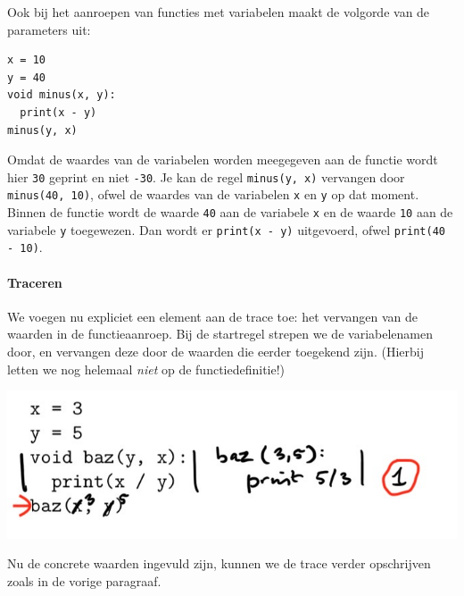 Ook bij het aanroepen van functies met variabelen maakt de volgorde van de parameters uit:

\vspace*{-\baselineskip}\begin{verbatim}
x = 10
y = 40
void minus(x, y):
  print(x - y)
minus(y, x)
\end{verbatim}\vspace*{-\baselineskip}

Omdat de waardes van de variabelen worden meegegeven aan de functie wordt hier \texttt{30} geprint en niet \texttt{-30}. Je kan de regel \texttt{minus(y, x)} vervangen door \texttt{minus(40, 10)}, ofwel de waardes van de variabelen \texttt{x} en \texttt{y} op dat moment. Binnen de functie wordt de waarde \texttt{40} aan de variabele \texttt{x} en de waarde \texttt{10} aan de variabele \texttt{y} toegewezen. Dan wordt er \texttt{print(x - y)} uitgevoerd, ofwel \texttt{print(40 - 10)}.

\paragraph{Traceren}

We voegen nu expliciet een element aan de trace toe: het vervangen van de waarden in de functieaanroep. Bij de startregel strepen we de variabelenamen door, en vervangen deze door de waarden die eerder toegekend zijn. (Hierbij letten we nog helemaal \emph{niet} op de functiedefinitie!)

\includegraphics[width=.8\textwidth]{3-trace-varsparams.jpeg}

Nu de concrete waarden ingevuld zijn, kunnen we de trace verder opschrijven zoals in de vorige paragraaf.
